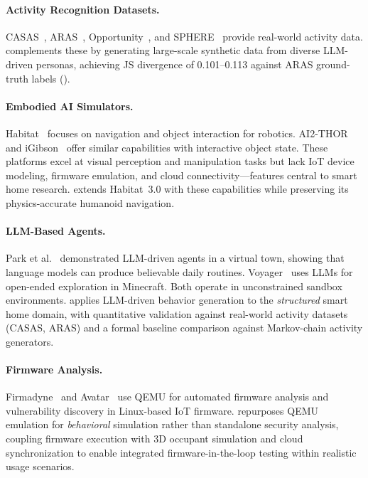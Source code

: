\paragraph{Activity Recognition Datasets.}
CASAS~\cite{casas}, ARAS~\cite{aras}, Opportunity~\cite{opportunity},
and SPHERE~\cite{sphere} provide real-world activity data.
\sys{} complements these by generating large-scale synthetic data
from diverse LLM-driven personas, achieving JS divergence of
0.101--0.113 against ARAS ground-truth labels ().

\paragraph{Embodied AI Simulators.}
Habitat~\cite{habitat19iccv,habitat3} focuses on navigation and
object interaction for robotics.
AI2-THOR~\cite{ai2thor} and iGibson~\cite{igibson} offer similar
capabilities with interactive object state.
These platforms excel at visual perception and manipulation tasks
but lack IoT device modeling, firmware emulation, and cloud
connectivity---features central to smart home research.
\sys{} extends Habitat~3.0 with these capabilities while preserving
its physics-accurate humanoid navigation.

\paragraph{LLM-Based Agents.}
Park et al.~\cite{generative-agents} demonstrated LLM-driven agents
in a virtual town, showing that language models can produce believable
daily routines.  Voyager~\cite{voyager} uses LLMs for open-ended
exploration in Minecraft.  Both operate in unconstrained sandbox
environments.  \sys{} applies LLM-driven behavior generation to the
\emph{structured} smart home domain, with quantitative validation
against real-world activity datasets (CASAS, ARAS) and a formal
baseline comparison against Markov-chain activity generators.

\paragraph{Firmware Analysis.}
Firmadyne~\cite{firmadyne} and Avatar~\cite{avatar} use QEMU for
automated firmware analysis and vulnerability discovery in
Linux-based IoT firmware.
\sys{} repurposes QEMU emulation for \emph{behavioral} simulation
rather than standalone security analysis, coupling firmware execution
with 3D occupant simulation and cloud synchronization to enable
integrated firmware-in-the-loop testing within realistic usage
scenarios.

